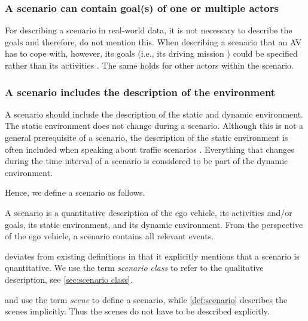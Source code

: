 \subsubsection{A scenario can contain goal(s) of one or multiple actors}
For describing a scenario in real-world data, it is not necessary to describe the goals and therefore, \textcite{elrofai2016scenario} do not mention this. When describing a scenario that an AV has to cope with, however, its goals (i.e., its driving mission \cite{geyer2014}) could be specified rather than its activities \cite{ulbrich2015}. The same holds for other actors within the scenario.

\subsubsection{A scenario includes the description of the environment}
A scenario should include the description of the static and dynamic environment. The static environment does not change during a scenario. Although this is not a general prerequisite of a scenario, the description of the static environment is often included when speaking about traffic scenarios \cite{geyer2014, ulbrich2015, elrofai2016scenario, ebner2011identifying, schuldt2013effiziente, althoff2017CommonRoad}. Everything that changes during the time interval of a scenario is considered to be part of the dynamic environment. 

Hence, we define a scenario as follows.
\begin{definition}[Scenario]\label{def:scenario}
	A scenario is a quantitative description of the ego vehicle, its activities and/or goals, its static environment, and its dynamic environment. From the perspective of the ego vehicle, a scenario contains all relevant events.
\end{definition}

 deviates from existing definitions \cite{geyer2014, ulbrich2015, elrofai2016scenario} in that it explicitly mentions that a scenario is quantitative. We use the term \emph{scenario class} to refer to the qualitative description, see \cref{sec:scenario class}.

\textcite{geyer2014} and \textcite{ulbrich2015} use the term \emph{scene} to define a scenario, while \cref{def:scenario} describes the scenes implicitly. Thus the scenes do not have to be described explicitly.

